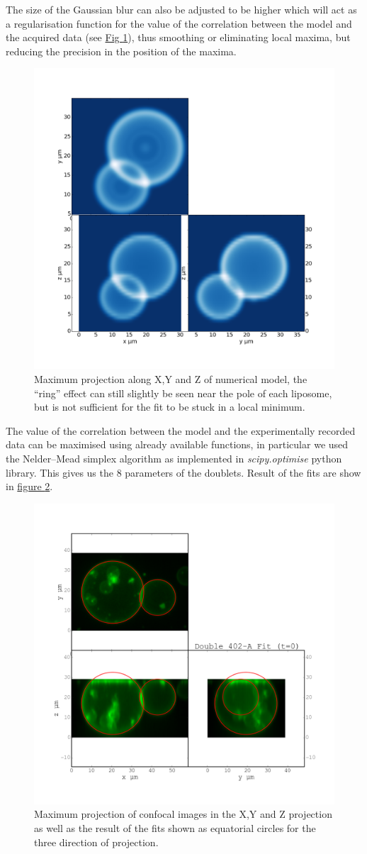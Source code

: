 \documentclass[A4paperpaper,11pt,english]{sphinxmanual}
\begin{document}
The size of the
Gaussian blur can also be adjusted to be higher which will act as a regularisation
function for the value of the correlation between the model and the acquired
data (see \hyperref[index-latex:max-proj-model]{Fig  \ref*{index-latex:max-proj-model}}), thus smoothing or eliminating local maxima,
but reducing the precision in the position of the maxima.
\begin{figure}[htbp]
\centering
\capstart

\includegraphics[width=0.500\linewidth]{max_proj_model.png}
\caption{Maximum projection along X,Y and Z of numerical model, the ``ring'' effect
can still slightly be seen near the pole of each liposome, but is not
sufficient for the fit to be stuck in a local minimum.}\label{index-latex:max-proj-model}\end{figure}

The value of the correlation between the model and the experimentally recorded
data can be maximised using already available functions, in particular we used
the Nelder–Mead simplex algorithm as implemented in \emph{scipy.optimise} python library. This
gives us the 8 parameters of the doublets. Result of the fits are show in
\hyperref[index-latex:fig-fit-t0]{figure  \ref*{index-latex:fig-fit-t0}}.
\begin{figure}[htbp]
\centering
\capstart

\includegraphics[width=0.500\linewidth]{Doublet-402-A-Fit-t-0.png}
\caption{Maximum projection of confocal images in the X,Y and Z projection as well
as the result of the fits shown as equatorial circles for the three
direction of projection.}\label{index-latex:fig-fit-t0}\end{figure}
\end{document}
